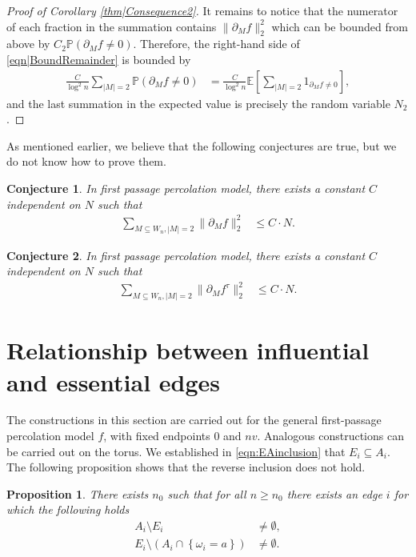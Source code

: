 \documentclass[reqno]{amsart}
\newtheorem{conjecture}{Conjecture}
\newtheorem{proposition}{Proposition}
\begin{document}
\begin{proof}[Proof of Corollary \ref{thm|Consequence2}]
 It remains to notice that the numerator of each fraction in the summation contains 
$\|\partial_Mf\|_2^2$ which can be bounded from above by $C_2 \mathbb P(\partial_Mf\neq 0)$. Therefore, the right-hand side of \eqref{eqn|BoundRemainder} is bounded by 
\begin{align*}\frac{C}{\log^2n}\sum_{|M|=2}\mathbb P\left(\partial_Mf\neq 0\right)&= \frac{C}{\log^2n}\mathbb E\left[\sum_{|M|=2}1_{\partial_Mf\neq 0}\right],
\end{align*}
and the last summation in the expected value is precisely the random variable $N_2$. 
\end{proof}




As mentioned earlier, we believe that the following conjectures are true, but we do not know how to prove them. 
\begin{conjecture}
In first passage percolation model, there exists a constant $C$ independent on $N$ such that 
\begin{align*}
\sum_{M\subseteq W_n, |M|=2} \|\partial_Mf\|_2^2&\leq C\cdot N.
\end{align*}
\end{conjecture}


\begin{conjecture}
In first passage percolation model, there exists a constant $C$ independent on $N$ such that 
\begin{align*}
\sum_{M\subseteq W_n, |M|=2} \|\partial_Mf^{\tau}\|_2^2&\leq C\cdot N.
\end{align*}
\end{conjecture}



 
\section{Relationship between influential and essential edges} \label{sec|relationshipIE}
The constructions in this section are carried out for the general first-passage percolation model $f$, with fixed endpoints $0$ and $nv$. Analogous constructions can be carried out on the torus.
We established in \eqref{eqn:EAinclusion} that $E_i\subseteq A_i$. The following proposition shows that the reverse inclusion does not hold.
\begin{proposition}\label{thm|NoOppositeInclusions}
There exists $n_0$ such that for all $n\geq n_0$ there exists an edge $i$ for which the following holds
\begin{align}
A_i \setminus E_i &\neq  \emptyset, \label{eqn|ReverseEAInclusion} \\
E_i\setminus \left(A_i\cap\left\{\omega_i=a\right\}\right)& \neq \emptyset.  \label{eqn|ReverseAEInclusion}
\end{align} 
\end{proposition}
\end{document}

